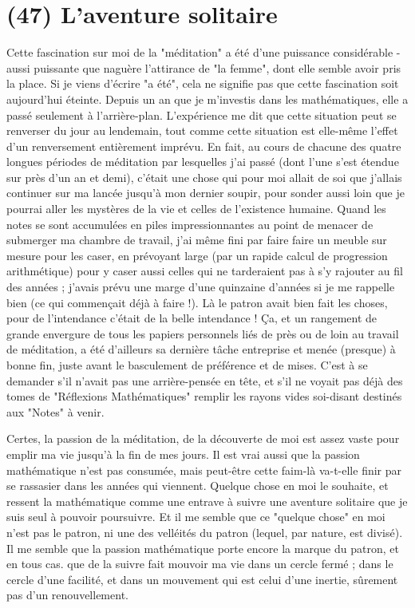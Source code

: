 \section{(47) L’aventure solitaire}

Cette fascination sur moi de la "méditation" a été d'une puissance considérable - aussi puissante que naguère l'attirance de "la femme", dont elle semble avoir pris la place. Si je viens d'écrire "a été", cela ne signifie pas que cette fascination soit aujourd'hui éteinte. Depuis un an que je m'investis dans les mathématiques, elle a passé seulement à l'arrière-plan. L'expérience me dit que cette situation peut se renverser du jour au lendemain, tout comme cette situation est elle-même l'effet d'un renversement entièrement imprévu. En fait, au cours de chacune des quatre longues périodes de méditation par lesquelles j’ai passé (dont l’une s’est étendue sur près d'un an et demi), c'était une chose qui pour moi allait de soi que j'allais continuer sur ma lancée jusqu'à mon dernier soupir, pour sonder aussi loin que je pourrai aller les mystères de la vie et celles de l'existence humaine. Quand les notes se sont accumulées en piles impressionnantes au point de menacer de submerger ma chambre de travail, j'ai même fini par faire faire un meuble sur mesure pour les caser, en prévoyant large (par un rapide calcul de progression arithmétique) pour y caser aussi celles qui ne tarderaient pas à s'y rajouter au fil des années ; j'avais prévu une marge d'une quinzaine d'années si je me rappelle bien (ce qui commençait déjà à faire !). Là le patron avait bien fait les choses, pour de l’intendance c’était de la belle intendance ! Ça, et un rangement de grande envergure de tous les papiers personnels liés de près ou de loin au travail de méditation, a été d'ailleurs sa dernière tâche entreprise et menée (presque) à bonne fin, juste avant le basculement de préférence et de mises. C'est à se demander s'il n'avait pas une arrière-pensée en tête, et s'il ne voyait pas déjà des tomes de "Réflexions Mathématiques" remplir les rayons vides soi-disant destinés aux "Notes" à venir.

Certes, la passion de la méditation, de la découverte de moi est assez vaste pour emplir ma vie jusqu'à la fin de mes jours. Il est vrai aussi que la passion mathématique n'est pas consumée, mais peut-être cette faim-là va-t-elle finir par se rassasier dans les années qui viennent. Quelque chose en moi le souhaite, et ressent la mathématique comme une entrave à suivre une aventure solitaire que je suis seul à pouvoir poursuivre. Et il me semble que ce "quelque chose" en moi n'est pas le patron, ni une des velléités du patron (lequel, par nature, est divisé). Il me semble que la passion mathématique porte encore la marque du patron, et en tous cas. que de la suivre fait mouvoir ma vie dans un cercle fermé ; dans le cercle d'une facilité, et dans un mouvement qui est celui d'une inertie, sûrement pas d'un renouvellement.

